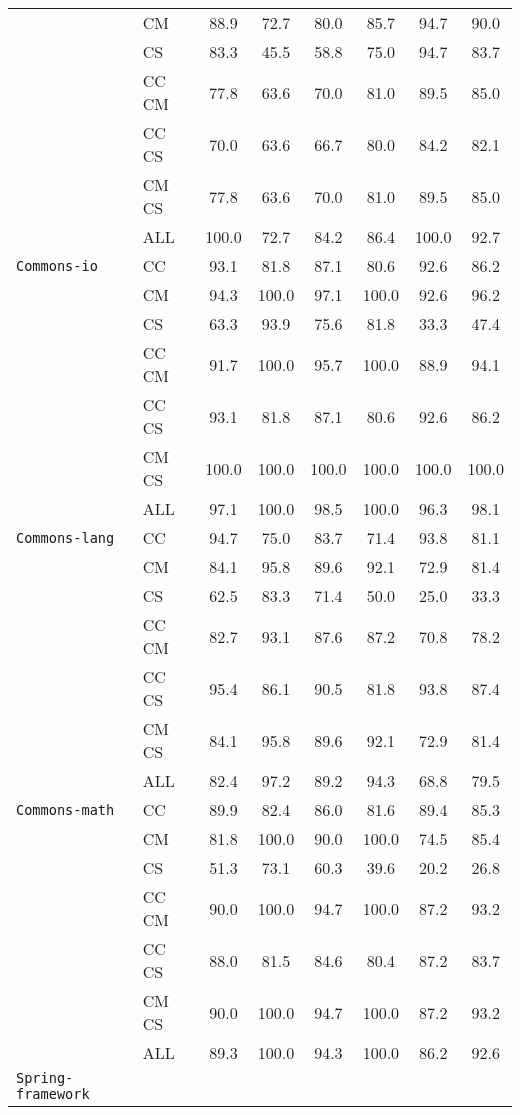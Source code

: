 {\begin{tabular}{l l | c c c | c c c}
& CM & 88.9 & 72.7 & 80.0 & 85.7 & 94.7 & 90.0 \\
& CS & 83.3 & 45.5 & 58.8 & 75.0 & 94.7 & 83.7 \\
& CC CM & 77.8 & 63.6 & 70.0 & 81.0 & 89.5 & 85.0 \\
& CC CS & 70.0 & 63.6 & 66.7 & 80.0 & 84.2 & 82.1 \\
& CM CS & 77.8 & 63.6 & 70.0 & 81.0 & 89.5 & 85.0 \\
& ALL & 100.0 & 72.7 & 84.2 & 86.4 & 100.0 & 92.7 \\
\midrule
{\tt Commons-io}
& CC & 93.1 & 81.8 & 87.1 & 80.6 & 92.6 & 86.2 \\
& CM & 94.3 & 100.0 & 97.1 & 100.0 & 92.6 & 96.2 \\
& CS & 63.3 & 93.9 & 75.6 & 81.8 & 33.3 & 47.4 \\
& CC CM & 91.7 & 100.0 & 95.7 & 100.0 & 88.9 & 94.1 \\
& CC CS & 93.1 & 81.8 & 87.1 & 80.6 & 92.6 & 86.2 \\
& CM CS & 100.0 & 100.0 & 100.0 & 100.0 & 100.0 & 100.0 \\
& ALL & 97.1 & 100.0 & 98.5 & 100.0 & 96.3 & 98.1 \\
\midrule
{\tt Commons-lang}
& CC & 94.7 & 75.0 & 83.7 & 71.4 & 93.8 & 81.1 \\
& CM & 84.1 & 95.8 & 89.6 & 92.1 & 72.9 & 81.4 \\
& CS & 62.5 & 83.3 & 71.4 & 50.0 & 25.0 & 33.3 \\
& CC CM & 82.7 & 93.1 & 87.6 & 87.2 & 70.8 & 78.2 \\
& CC CS & 95.4 & 86.1 & 90.5 & 81.8 & 93.8 & 87.4 \\
& CM CS & 84.1 & 95.8 & 89.6 & 92.1 & 72.9 & 81.4 \\
& ALL & 82.4 & 97.2 & 89.2 & 94.3 & 68.8 & 79.5 \\
\midrule
{\tt Commons-math}
& CC & 89.9 & 82.4 & 86.0 & 81.6 & 89.4 & 85.3 \\
& CM & 81.8 & 100.0 & 90.0 & 100.0 & 74.5 & 85.4 \\
& CS & 51.3 & 73.1 & 60.3 & 39.6 & 20.2 & 26.8 \\
& CC CM & 90.0 & 100.0 & 94.7 & 100.0 & 87.2 & 93.2 \\
& CC CS & 88.0 & 81.5 & 84.6 & 80.4 & 87.2 & 83.7 \\
& CM CS & 90.0 & 100.0 & 94.7 & 100.0 & 87.2 & 93.2 \\
& ALL & 89.3 & 100.0 & 94.3 & 100.0 & 86.2 & 92.6 \\
\midrule
{\tt Spring-framework}

\end{tabular}}
